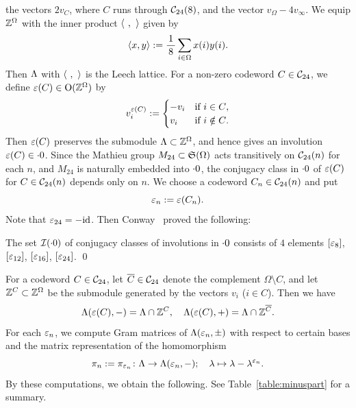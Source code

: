 \documentclass{amsart} %
\begin{document}
the vectors $2v_C$,
where $C$ runs through $\mathord{\mathcal{C}}_{24}(8)$, and 
the vector $v_{\Omega}-4v_{\infty}$.
%
%
We equip $\mathord{\mathbb{Z}}^{\Omega}$ with the inner product $\langle \phantom{i}, \phantom{i} \rangle$ 
given by
\[
\langle x, y \rangle:=\frac{1}{\,8\,} \sum_{i\in\Omega} x(i) y(i).
\]
Then $\Lambda$ with $\langle \phantom{i}, \phantom{i} \rangle$ is the Leech lattice.
For a non-zero codeword $C\in \mathord{\mathcal{C}}_{24}$,
we define $\varepsilon(C)\in \mathord{\mathrm{O}}(\mathord{\mathbb{Z}}^{\Omega})$ by 
\[
v_i^{\varepsilon(C)}:=
\begin{cases}
-v_i & \textrm{if $i\in C$}, \\
v_i& \textrm{if $i\notin C$}.
\end{cases}
\]
Then $\varepsilon(C)$ 
preserves the submodule $\Lambda\subset \mathord{\mathbb{Z}}^{\Omega}$, and hence gives 
an involution $\varepsilon(C)\in \cdot 0$. 
Since the Mathieu group $M_{24}\subset \mathord{\mathfrak{S}}(\Omega)$ acts transitively
on $\mathord{\mathcal{C}}_{24}(n)$ for each $n$, 
and $M_{24}$ is naturally embedded into $\cdot 0$,
the conjugacy class in $\cdot 0$ of $\varepsilon(C)$ for $C\in \mathord{\mathcal{C}}_{24}(n)$ 
depends only on $n$.
We choose a codeword $C_n\in \mathord{\mathcal{C}}_{24}(n)$ and put
\[
\varepsilon_n:=\varepsilon(C_n).
\]
Note that $\varepsilon_{24}=-\mathord{\mathrm{id}}$.
Then Conway~\cite[Chapter 10, Section 3.7]{theCSbook} proved the following:
%
\begin{theorem}[Conway]
The set $\mathord{\mathcal{I}}(\cdot 0)$ of conjugacy classes of involutions in $\cdot 0$ 
consists of $4$ elements $[\varepsilon_8]$, $[\varepsilon_{12}]$, $[\varepsilon_{16}]$, $[\varepsilon_{24}]$.
\qed
\end{theorem}
%
%
%
For a codeword $C\in \mathord{\mathcal{C}}_{24}$,
let $\overline{C}\in \mathord{\mathcal{C}}_{24}$ denote the complement $\Omega\setminus C$,
and let 
$\mathord{\mathbb{Z}}^{C}\subset \mathord{\mathbb{Z}}^{\Omega}$ be 
the submodule generated by the vectors $v_i$ ($i\in C$).
Then we have
%
\begin{equation}\label{eq:Leechveppm}
\Lambda(\varepsilon(C), -)=\Lambda\cap \mathord{\mathbb{Z}}^{C},
\quad
\Lambda(\varepsilon(C), +)=\Lambda\cap \mathord{\mathbb{Z}}^{\overline{C}}.
\end{equation}
%
For each $\varepsilon_n$,
we compute Gram matrices of $\Lambda(\varepsilon_n, \pm)$ 
with respect to certain bases
and the matrix representation of the homomorphism 
\[
\pi_n:=\pi_{\varepsilon_n}\colon \Lambda \to \Lambda(\varepsilon_n, -); \quad \lambda\mapsto \lambda-\lambda^{\varepsilon_n}.
\]
By these computations,
 we obtain the following.
 See Table~\ref{table:minuspart} for a summary.
\end{document}
